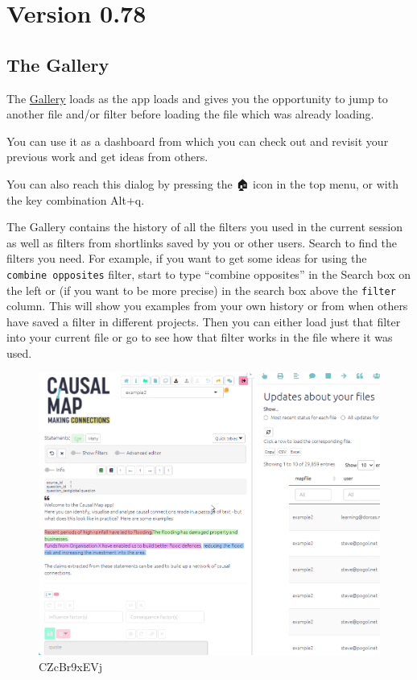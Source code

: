 \documentclass[
]{book}
\begin{document}
\hypertarget{version-0.78}{%
\section{Version 0.78}\label{version-0.78}}

\hypertarget{the-gallery}{%
\subsection{The Gallery}\label{the-gallery}}

The \protect\hyperlink{xgallery}{Gallery} loads as the app loads and gives you the opportunity to jump to another file and/or filter before loading the file which was already loading.

You can use it as a dashboard from which you can check out and revisit your previous work and get ideas from others.

You can also reach this dialog by pressing the 🏠 icon in the top menu, or with the key combination Alt+q.

The Gallery contains the history of all the filters you used in the current session as well as filters from shortlinks saved by you or other users. Search to find the filters you need. For example, if you want to get some ideas for using the \texttt{combine\ opposites} filter, start to type ``combine opposites'' in the Search box on the left or (if you want to be more precise) in the search box above the \texttt{filter} column. This will show you examples from your own history or from when others have saved a filter in different projects. Then you can either load just that filter into your current file or go to see how that filter works in the file where it was used.

\begin{figure}
\centering
\includegraphics{_assets/CZcBr9xEVj.gif}
\caption{CZcBr9xEVj}
\end{figure}
\end{document}
